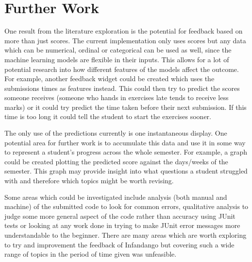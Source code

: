 \section{Further Work}
One result from the literature exploration is the potential for feedback based on more than just scores. The current implementation only uses scores but any data which can be numerical, ordinal or categorical can be used as well, since the machine learning models are flexible in their inputs. This allows for a lot of potential research into how different features of the models affect the outcome. For example, another feedback widget could be created which uses the submissions times as features instead. This could then try to predict the scores someone receives (someone who hands in exercises late tends to receive less marks) or it could try predict the time taken before their next submission. If this time is too long it could tell the student to start the exercises sooner.

The only use of the predictions currently is one instantaneous display. One potential area for further work is to accumulate this data and use it in some way to represent a student's progress across the whole semester. For example, a graph could be created plotting the predicted score against the days/weeks of the semester. This graph may provide insight into what questions a student struggled with and therefore which topics might be worth revising.

Some areas which could be investigated include analysis (both manual and machine) of the submitted code to look for common errors, qualitative analysis to judge some more general aspect of the code rather than accuracy using JUnit tests or looking at any work done in trying to make JUnit error messages more understandable to the beginner. There are many areas which are worth exploring to try and improvement the feedback of Infandango but covering such a wide range of topics in the period of time given was unfeasible.

